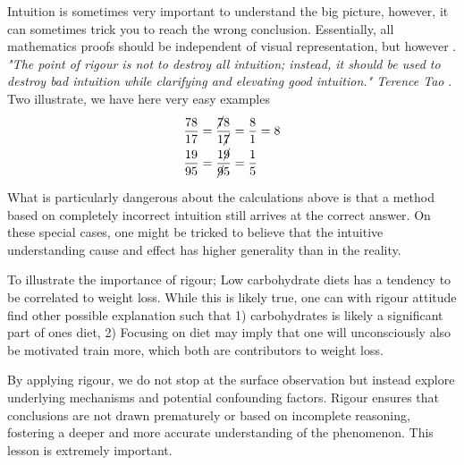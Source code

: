 \documentclass[10pt,twocolumn]{article}
\begin{document}
\begin{sloppy}
Intuition is sometimes very important to understand the big picture, however, it can sometimes trick you to reach the wrong conclusion. Essentially, all mathematics proofs should be independent of visual representation, but however . \textit{"The point of rigour is not to
destroy all intuition; instead, it should be used to destroy bad intuition while clarifying and elevating good intuition." Terence Tao }\cite{Tao2022}.
Two illustrate, we have here very easy examples \begin{align}
    \frac{78}{17}  &=  \frac{ \cancel{7}8}{ 1 \cancel{7}} = \frac{8}{1} = 8 \\
    \frac{19}{95}  &=  \frac{ 1\cancel{9}}{  \cancel{9} 5} = \frac{1}{5}
\end{align}

What is particularly dangerous about the calculations above is that a method based on completely incorrect intuition still arrives at the correct answer. On these special cases, one might be tricked to believe that the intuitive understanding cause
and effect has higher generality
than in the reality.

To illustrate the importance of rigour; Low carbohydrate diets has a tendency to be correlated to weight loss. While this is likely true, one can with rigour attitude find other possible explanation such that 1) carbohydrates is
likely a significant part of ones diet, 2) Focusing on diet may imply that one will unconsciously  also be motivated train more, which both are contributors to weight loss.

By applying rigour, we do not stop at the surface observation but instead explore underlying mechanisms and potential confounding factors. Rigour ensures that conclusions are not drawn prematurely or based on incomplete reasoning, fostering a deeper
and more accurate understanding of the phenomenon. This lesson is extremely important.




\end{sloppy}
\end{document}
